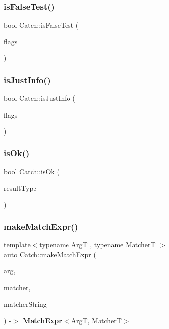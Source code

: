\mbox{\label{namespace_catch_a93ef4e3e307a2021ca0d41b32c0e54b0}} 
\subsubsection{isFalseTest()}
{\footnotesize\ttfamily bool Catch\+::is\+False\+Test (\begin{DoxyParamCaption}\item[{int}]{flags }\end{DoxyParamCaption})\hspace{0.3cm}{\ttfamily [inline]}}

\mbox{\label{namespace_catch_a54b01af61673a3e1f21f31713639b180}} 
\subsubsection{isJustInfo()}
{\footnotesize\ttfamily bool Catch\+::is\+Just\+Info (\begin{DoxyParamCaption}\item[{int}]{flags }\end{DoxyParamCaption})}

\mbox{\label{namespace_catch_a5205869c81c06d3460759cb86676ae68}} 
\subsubsection{isOk()}
{\footnotesize\ttfamily bool Catch\+::is\+Ok (\begin{DoxyParamCaption}\item[{\textbf{ Result\+Was\+::\+Of\+Type}}]{result\+Type }\end{DoxyParamCaption})}

\mbox{\label{namespace_catch_a23a9a9a6dfef7ecd5e0eaf553fc52de6}} 
\subsubsection{makeMatchExpr()}
{\footnotesize\ttfamily template$<$typename ArgT , typename MatcherT $>$ \\
auto Catch\+::make\+Match\+Expr (\begin{DoxyParamCaption}\item[{ArgT const \&}]{arg,  }\item[{MatcherT const \&}]{matcher,  }\item[{\textbf{ String\+Ref} const \&}]{matcher\+String }\end{DoxyParamCaption}) -\/$>$ \textbf{ Match\+Expr}$<$ArgT, MatcherT$>$ }

